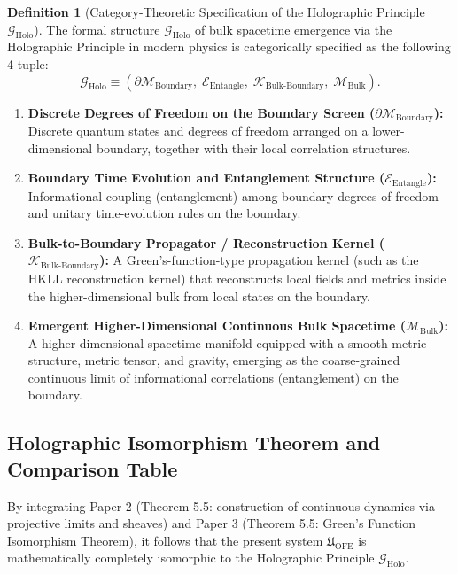 \documentclass[11pt,a4paper]{article}
\theoremstyle{definition}
\newtheorem{definition}{Definition}[section]
\theoremstyle{plain}
\begin{document}
\begin{definition}[Category-Theoretic Specification of the Holographic Principle $\mathcal{G}_{\mathrm{Holo}}$]
The formal structure $\mathcal{G}_{\mathrm{Holo}}$ of bulk spacetime emergence via the Holographic Principle in modern physics is categorically specified as the following 4-tuple:
\[
\mathcal{G}_{\mathrm{Holo}} \equiv \left(\partial\mathcal{M}_{\mathrm{Boundary}},\; \mathcal{E}_{\mathrm{Entangle}},\; \mathcal{K}_{\mathrm{Bulk\text{-}Boundary}},\; \mathcal{M}_{\mathrm{Bulk}}\right).
\]
\begin{enumerate}
    \item \textbf{Discrete Degrees of Freedom on the Boundary Screen ($\partial\mathcal{M}_{\mathrm{Boundary}}$):} Discrete quantum states and degrees of freedom arranged on a lower-dimensional boundary, together with their local correlation structures.
    \item \textbf{Boundary Time Evolution and Entanglement Structure ($\mathcal{E}_{\mathrm{Entangle}}$):} Informational coupling (entanglement) among boundary degrees of freedom and unitary time-evolution rules on the boundary.
    \item \textbf{Bulk-to-Boundary Propagator / Reconstruction Kernel ($\mathcal{K}_{\mathrm{Bulk\text{-}Boundary}}$):} A Green's-function-type propagation kernel (such as the HKLL reconstruction kernel) that reconstructs local fields and metrics inside the higher-dimensional bulk from local states on the boundary.
    \item \textbf{Emergent Higher-Dimensional Continuous Bulk Spacetime ($\mathcal{M}_{\mathrm{Bulk}}$):} A higher-dimensional spacetime manifold equipped with a smooth metric structure, metric tensor, and gravity, emerging as the coarse-grained continuous limit of informational correlations (entanglement) on the boundary.
\end{enumerate}
\end{definition}

\subsection{Holographic Isomorphism Theorem and Comparison Table}
By integrating Paper 2 (Theorem 5.5: construction of continuous dynamics via projective limits and sheaves) and Paper 3 (Theorem 5.5: Green's Function Isomorphism Theorem), it follows that the present system $\mathfrak{U}_{\mathrm{OFE}}$ is mathematically completely isomorphic to the Holographic Principle $\mathcal{G}_{\mathrm{Holo}}$.
\end{document}
